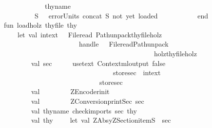 \begin{isabellebody}
\ \ \ \ \ \ \ \ \ \ \ \ \ {\isacharbrackleft}{\isacharbrackright}\ {\isacharequal}{\isachargreater}\ thy{\isacharunderscore}name\isanewline
\ \ \ \ \ \ \ \ \ \ \ {\isacharbar}\ S\ \ {\isacharequal}{\isachargreater}\ error{\isacharparenleft}{\isachardoublequote}Units{\isacharcolon}\ {\isachardoublequote}{\isacharcircum}{\isacharparenleft}concat\ S{\isacharparenright}{\isacharcircum}{\isachardoublequote}\ not\ yet\ loaded{\isacharbang}{\isachardoublequote}{\isacharparenright}\ \ \ \ \isanewline
\ \ \ \ \ \ \ end\isanewline
\isanewline
\isanewline
\ \ \ fun\ load{\isacharunderscore}holz\ thy{\isacharunderscore}file\ thy\ \ {\isacharequal}\ \isanewline
\ \ \ \ \ \ \ let\ val\ intext\ \ {\isacharequal}\ {\isacharparenleft}File{\isachardot}read\ {\isacharparenleft}Path{\isachardot}unpack{\isacharparenleft}thy{\isacharunderscore}file{\isacharcircum}{\isachardoublequote}{\isachardot}holz{\isachardoublequote}{\isacharparenright}{\isacharparenright}{\isacharparenright}\isanewline
\ \ \ \ \ \ \ \ \ \ \ \ \ \ \ \ \ \ \ \ \ \ \ \ \ handle\ {\isacharunderscore}\ {\isacharequal}{\isachargreater}\ File{\isachardot}read{\isacharparenleft}Path{\isachardot}unpack{\isacharparenleft}\isanewline
\ \ \ \ \ \ \ \ \ \ \ \ \ \ \ \ \ \ \ \ \ \ \ \ \ \ \ \ \ \ \ \ \ \ \ \ \ \ \ \ \ \ \ \ \ \ \ {\isachardoublequote}holz{\isacharslash}{\isachardoublequote}{\isacharcircum}thy{\isacharunderscore}file{\isacharcircum}{\isachardoublequote}{\isachardot}holz{\isachardoublequote}{\isacharparenright}{\isacharparenright}{\isacharsemicolon}\isanewline
\ \ \ \ \ \ \ \ \ \ \ val\ sec\ \ \ \ \ {\isacharequal}\ {\isacharparenleft}use{\isacharunderscore}text\ Context{\isachardot}ml{\isacharunderscore}output\ false\ \isanewline
\ \ \ \ \ \ \ \ \ \ \ \ \ \ \ \ \ \ \ \ \ \ \ \ \ \ \ \ \ \ \ \ \ \ \ {\isacharparenleft}{\isachardoublequote}store{\isacharunderscore}sec\ {\isacharcolon}{\isacharequal}\ {\isachardoublequote}{\isacharcircum}intext{\isacharparenright}{\isacharsemicolon}\isanewline
\ \ \ \ \ \ \ \ \ \ \ \ \ \ \ \ \ \ \ \ \ \ \ \ \ \ \ \ \ \ \ {\isacharbang}store{\isacharunderscore}sec{\isacharparenright}\isanewline
\ \ \ \ \ \ \ \ \ \ \ val\ {\isacharunderscore}\ \ \ \ \ \ \ {\isacharequal}\ ZEncoder{\isachardot}init{\isacharparenleft}{\isacharparenright}{\isacharsemicolon}\isanewline
\ \ \ \ \ \ \ \ \ \ \ val\ {\isacharunderscore}\ \ \ \ \ \ \ {\isacharequal}\ ZConversion{\isachardot}printSec\ sec{\isacharsemicolon}\isanewline
\ \ \ \ \ \ \ \ \ \ \ val\ thy{\isacharunderscore}name{\isacharequal}\ check{\isacharunderscore}imports\ sec\ thy{\isacharsemicolon}\isanewline
\ \ \ \ \ \ \ \ \ \ \ val\ thy{\isacharprime}\ \ \ \ {\isacharequal}\ let\ val\ {\isacharparenleft}ZAbsy{\isachardot}ZSection{\isacharparenleft}{\isacharunderscore}{\isacharcomma}{\isacharunderscore}{\isacharcomma}itemS{\isacharparenright}{\isacharparenright}\ {\isacharequal}\ sec\isanewline

\end{isabellebody}

